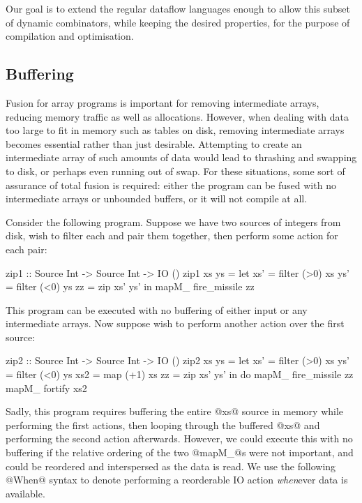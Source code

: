 Our goal is to extend the regular dataflow languages enough to allow this subset of dynamic combinators, while keeping the desired properties, for the purpose of compilation and optimisation.

\subsection{Buffering}

Fusion for array programs is important for removing intermediate arrays, reducing memory traffic as well as allocations.
However, when dealing with data too large to fit in memory such as tables on disk, removing intermediate arrays becomes essential rather than just desirable.
Attempting to create an intermediate array of such amounts of data would lead to thrashing and swapping to disk, or perhaps even running out of swap.
For these situations, some sort of assurance of total fusion is required: either the program can be fused with no intermediate arrays or unbounded buffers, or it will not compile at all.

Consider the following program.
Suppose we have two sources of integers from disk, wish to filter each and pair them together, then perform some action for each pair:

\begin{code}
zip1 :: Source Int -> Source Int -> IO ()
zip1 xs ys
 = let xs'  = filter (>0) xs
       ys'  = filter (<0) ys
       zz   = zip xs' ys'
   in  mapM_ fire_missile zz
\end{code}

This program can be executed with no buffering of either input or any intermediate arrays.
Now suppose wish to perform another action over the first source:

\begin{code}
zip2 :: Source Int -> Source Int -> IO ()
zip2 xs ys
 = let xs'  = filter (>0) xs
       ys'  = filter (<0) ys
       xs2  = map    (+1) xs
       zz   = zip xs' ys'
   in  do   mapM_ fire_missile zz
            mapM_ fortify      xs2
\end{code}

Sadly, this program requires buffering the entire @xs@ source in memory while performing the first actions, then looping through the buffered @xs@ and performing the second action afterwards.
However, we could execute this with no buffering if the relative ordering of the two @mapM_@s were not important, and could be reordered and interspersed as the data is read.
We use the following @When@ syntax to denote performing a reorderable IO action \emph{when}ever data is available.

